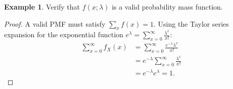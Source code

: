 \documentclass[12pt,a4paper]{report}
\theoremstyle{definition}
\newtheorem{example}[thm]{Example}
\theoremstyle{plain}
\theoremstyle{definition}
\begin{document}
\begin{example}
Verify that $f(x; \lambda)$ is a valid probability mass function.
\end{example}
\begin{proof}
A valid PMF must satisfy $\sum_{x} f(x) = 1$. Using the Taylor series expansion for the exponential function $e^\lambda = \sum_{x=0}^{\infty} \frac{\lambda^x}{x!}$:
\begin{align*}
\sum_{x = 0}^{\infty} f_X(x) &= \sum^{\infty}_{x = 0}\frac{e^{-\lambda} \lambda^x}{x!}\\
&= e^{-\lambda} \sum^{\infty}_{x = 0} \frac{\lambda^x}{x!}\\
& = e^{-\lambda} e^{\lambda} = 1.
\end{align*}
\end{proof}


     
\end{document}
